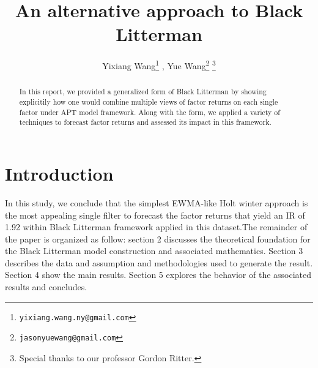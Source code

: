 \documentclass[12pt]{article}
\numberwithin{equation}{section}
\begin{document}
\title{\bf An alternative approach to Black Litterman}

\author{Yixiang Wang\footnote{{\tt  yixiang.wang.ny@gmail.com}}{\setcounter{footnote}{1}} , Yue Wang\footnote{{\tt jasonyuewang@gmail.com}}{\setcounter{footnote}{2}} \thanks{Special thanks to our professor Gordon Ritter.}
}



\maketitle\thispagestyle{empty}
 


\begin{abstract}
In this report, we provided a generalized form of Black Litterman by showing explicitily how one would combine multiple views of factor returns on each single factor under APT model framework. Along with the form, we applied a variety of techniques to forecast factor returns and assessed its impact in this framework. 

\end{abstract}

%
%
%
%

\section{Introduction}

In this study, we conclude that the simplest EWMA-like Holt winter approach is the most appealing single filter to forecast the factor returns that yield an IR of 1.92 within Black Litterman framework applied in this dataset.The remainder of the paper is organized as follow: section 2 discusses the theoretical foundation for the Black Litterman model construction and associated mathematics. Section 3 describes the data and assumption and methodologies used to generate the result. Section 4 show the main results. Section 5 explores the behavior of the associated results and concludes.
\end{document}
